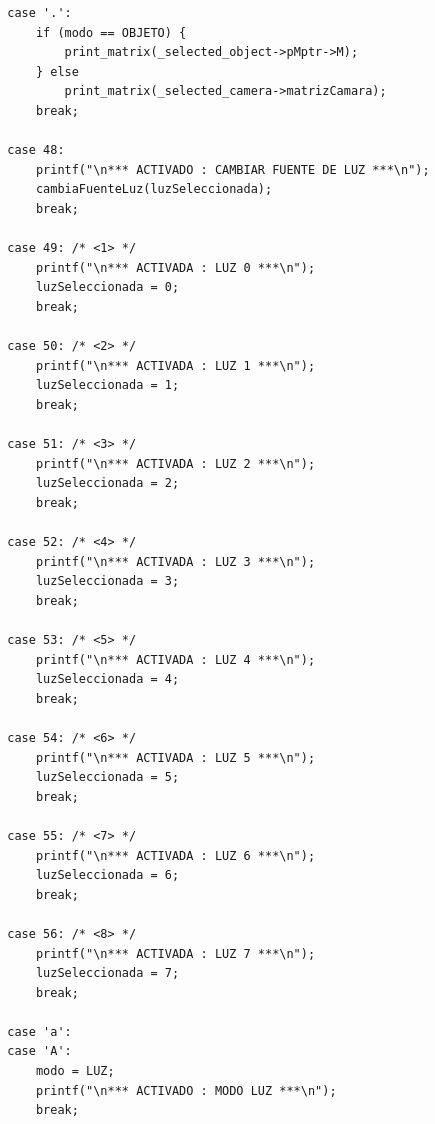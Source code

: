 \documentclass[12pt,a4paper]{article}
\begin{document}
\begin{lstlisting}
        case '.':
            if (modo == OBJETO) {
                print_matrix(_selected_object->pMptr->M);
            } else
                print_matrix(_selected_camera->matrizCamara);
            break;
            
        case 48:
            printf("\n*** ACTIVADO : CAMBIAR FUENTE DE LUZ ***\n");
            cambiaFuenteLuz(luzSeleccionada);
            break;
            
        case 49: /* <1> */
            printf("\n*** ACTIVADA : LUZ 0 ***\n");
            luzSeleccionada = 0;
            break;
            
        case 50: /* <2> */
            printf("\n*** ACTIVADA : LUZ 1 ***\n");
            luzSeleccionada = 1;
            break;
            
        case 51: /* <3> */
            printf("\n*** ACTIVADA : LUZ 2 ***\n");
            luzSeleccionada = 2;
            break;
            
        case 52: /* <4> */
            printf("\n*** ACTIVADA : LUZ 3 ***\n");
            luzSeleccionada = 3;
            break;
            
        case 53: /* <5> */
            printf("\n*** ACTIVADA : LUZ 4 ***\n");
            luzSeleccionada = 4;
            break;
            
        case 54: /* <6> */
            printf("\n*** ACTIVADA : LUZ 5 ***\n");
            luzSeleccionada = 5;
            break;
            
        case 55: /* <7> */
            printf("\n*** ACTIVADA : LUZ 6 ***\n");
            luzSeleccionada = 6;
            break;
            
        case 56: /* <8> */
            printf("\n*** ACTIVADA : LUZ 7 ***\n");
            luzSeleccionada = 7;
            break;
            
        case 'a':
        case 'A':
            modo = LUZ;
            printf("\n*** ACTIVADO : MODO LUZ ***\n");
            break;
            

\end{lstlisting}
\end{document}
